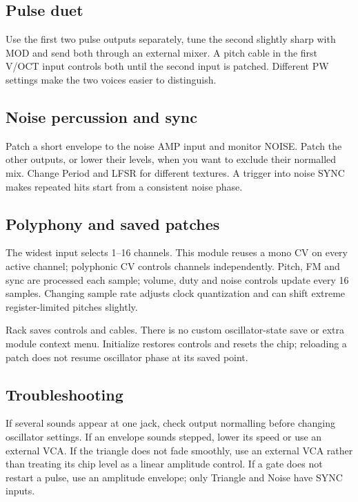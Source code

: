 \subsection{Pulse duet}
Use the first two pulse outputs separately, tune the second slightly sharp
with MOD and send both through an external mixer. A pitch cable in the first
V/OCT input controls both until the second input is patched. Different PW
settings make the two voices easier to distinguish.
\subsection{Noise percussion and sync}
Patch a short envelope to the noise AMP input and monitor NOISE. Patch the
other outputs, or lower their levels, when you want to exclude their normalled
mix. Change Period and LFSR for different textures. A trigger into noise SYNC
makes repeated hits start from a consistent noise phase.
\subsection{Polyphony and saved patches}
The widest input selects 1--16 channels. This module reuses a mono CV on every
active channel; polyphonic CV controls channels independently. Pitch, FM and
sync are processed each sample; volume, duty and noise controls update every
16 samples. Changing sample rate adjusts clock quantization and can shift
extreme register-limited pitches slightly.

Rack saves controls and cables. There is no custom oscillator-state save or
extra module context menu. Initialize restores controls and resets the chip;
reloading a patch does not resume oscillator phase at its saved point.
\subsection{Troubleshooting}
If several sounds appear at one jack, check output normalling before changing
oscillator settings. If an envelope sounds stepped, lower its speed or use an
external VCA. If the triangle does not fade smoothly, use an external VCA
rather than treating its chip level as a linear amplitude control. If a gate
does not restart a pulse, use an amplitude envelope; only Triangle and Noise
have SYNC inputs.
